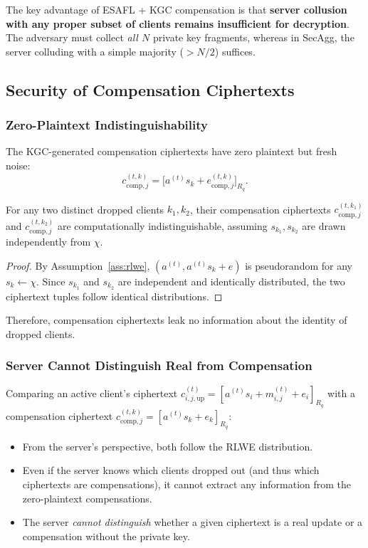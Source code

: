 The key advantage of ESAFL + KGC compensation is that \textbf{server collusion with any proper subset of clients remains insufficient for decryption}. The adversary must collect \emph{all $N$} private key fragments, whereas in SecAgg, the server colluding with a simple majority ($> N/2$) suffices.

\subsection{Security of Compensation Ciphertexts}
\label{ssec:compensation-security}

\subsubsection{Zero-Plaintext Indistinguishability}

The KGC-generated compensation ciphertexts have zero plaintext but fresh noise:
\begin{equation}
    c_{\mathrm{comp},j}^{(t,k)} = \bigl[ a^{(t)} s_k + e_{\mathrm{comp},j}^{(t,k)} \bigr]_{R_q}.
\end{equation}

\begin{lemma}
\label{lem:comp-ind}
For any two distinct dropped clients $k_1, k_2$, their compensation ciphertexts $c_{\mathrm{comp},j}^{(t,k_1)}$ and $c_{\mathrm{comp},j}^{(t,k_2)}$ are computationally indistinguishable, assuming $s_{k_1}, s_{k_2}$ are drawn independently from $\chi$.
\end{lemma}

\begin{proof}
By Assumption~\ref{ass:rlwe}, $(a^{(t)}, a^{(t)} s_k + e)$ is pseudorandom for any $s_k \gets \chi$. Since $s_{k_1}$ and $s_{k_2}$ are independent and identically distributed, the two ciphertext tuples follow identical distributions.
\end{proof}

Therefore, compensation ciphertexts leak no information about the identity of dropped clients.

\subsubsection{Server Cannot Distinguish Real from Compensation}

Comparing an active client's ciphertext $c_{i,j,\mathrm{up}}^{(t)} = [a^{(t)} s_i + m_{i,j}^{(t)} + e_i]_{R_q}$ with a compensation ciphertext $c_{\mathrm{comp},j}^{(t,k)} = [a^{(t)} s_k + e_k]_{R_q}$:
\begin{itemize}
    \item From the server's perspective, both follow the RLWE distribution.
    \item Even if the server knows which clients dropped out (and thus which ciphertexts are compensations), it cannot extract any information from the zero-plaintext compensations.
    \item The server \emph{cannot distinguish} whether a given ciphertext is a real update or a compensation without the private key.
\end{itemize}

